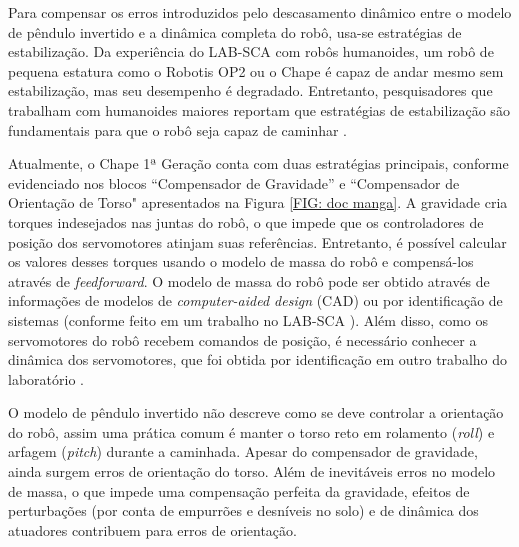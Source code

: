 Para compensar os erros introduzidos pelo descasamento dinâmico entre o modelo de pêndulo invertido e a dinâmica completa do robô, usa-se estratégias de estabilização. Da experiência do LAB-SCA com robôs humanoides, um robô de pequena estatura como o Robotis OP2 ou o Chape é capaz de andar mesmo sem estabilização, mas seu desempenho é degradado. Entretanto, pesquisadores que trabalham com humanoides maiores reportam que estratégias de estabilização são fundamentais para que o robô seja capaz de caminhar \cite{naveau2017}.

Atualmente, o Chape 1ª Geração conta com duas estratégias principais, conforme evidenciado nos blocos ``Compensador de Gravidade'' e ``Compensador de Orientação de Torso" apresentados na Figura \ref{FIG: doc manga}. A gravidade cria torques indesejados nas juntas do robô, o que impede que os controladores de posição dos servomotores atinjam suas referências. Entretanto, é possível calcular os valores desses torques usando o modelo de massa do robô e compensá-los através de \emph{feedforward}. O modelo de massa do robô pode ser obtido através de informações de modelos de \emph{computer-aided design} (CAD) ou por identificação de sistemas (conforme feito em um trabalho no LAB-SCA \cite{silva2019b}). Além disso, como os servomotores do robô recebem comandos de posição, é necessário conhecer a dinâmica dos servomotores, que foi obtida por identificação em outro trabalho do laboratório \cite{max27}.

O modelo de pêndulo invertido não descreve como se deve controlar a orientação do robô, assim uma prática comum é manter o torso reto em rolamento (\emph{roll}) e arfagem (\emph{pitch}) durante a caminhada. Apesar do compensador de gravidade, ainda surgem erros de orientação do torso. Além de inevitáveis erros no modelo de massa, o que impede uma compensação perfeita da gravidade, efeitos de perturbações (por conta de empurrões e desníveis no solo) e de dinâmica dos atuadores contribuem para erros de orientação.

